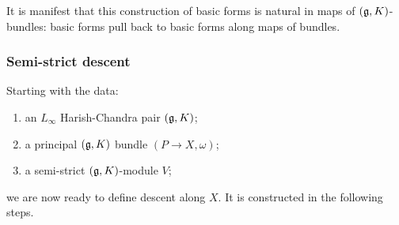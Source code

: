 \documentclass[10pt]{amsart}
\begin{document}
It is manifest that this construction of basic forms is natural in maps of $(\mathfrak g,K)$-bundles: basic forms pull back to basic forms along maps of bundles.

\subsubsection{Semi-strict descent}

Starting with the data:
\begin{enumerate}
\item an $L_\infty$ Harish-Chandra pair $(\mathfrak g,K)$;
\item a principal $(\mathfrak g,K)$ bundle $(P \to X, \omega)$;
\item a semi-strict $(\mathfrak g,K)$-module $V$;
\end{enumerate}
we are now ready to define descent along $X$. 
It is constructed in the following steps.
\end{document}
